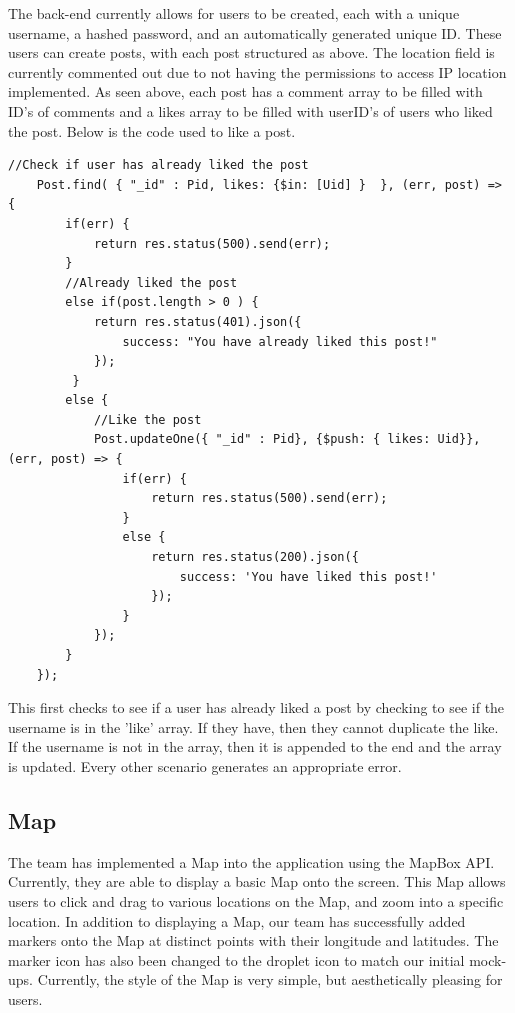\documentclass[draftclsnofoot, onecolumn, letterpaper,10pt,compsoc]{IEEEtran}
\begin{document}
The back-end currently allows for users to be created, each with a unique username, a hashed password, and an automatically generated unique ID.  These users can create posts, with each post structured as above.  The location field is currently commented out due to not having the permissions to access IP location implemented.  As seen above, each post has a comment array to be filled with ID's of comments and a likes array to be filled with userID's of users who liked the post.  Below is the code used to like a post.
\begin{lstlisting}
//Check if user has already liked the post
    Post.find( { "_id" : Pid, likes: {$in: [Uid] }  }, (err, post) => {
        if(err) {
            return res.status(500).send(err);
        }
        //Already liked the post
        else if(post.length > 0 ) {
            return res.status(401).json({
                success: "You have already liked this post!"
            });
         }
        else {
            //Like the post
            Post.updateOne({ "_id" : Pid}, {$push: { likes: Uid}}, (err, post) => {
                if(err) {
                    return res.status(500).send(err);
                }
                else {
                    return res.status(200).json({
                        success: 'You have liked this post!'
                    });
                }
            });
        }
    });
\end{lstlisting}
This first checks to see if a user has already liked a post by checking to see if the username is in the 'like' array.  If they have, then they cannot duplicate the like.  If the username is not in the array, then it is appended to the end and the array is updated.  Every other scenario generates an appropriate error.

\subsection{Map}
The team has implemented a Map into the application using the MapBox API. Currently, they are able to display a basic Map onto the screen. This Map allows users to click and drag to various locations on the Map, and zoom into a specific location. In addition to displaying a Map, our team has successfully added markers onto the Map at distinct points with their longitude and latitudes. The marker icon has also been changed to the droplet icon to match our initial mock-ups. Currently, the style of the Map is very simple, but aesthetically pleasing for users.
\end{document}

